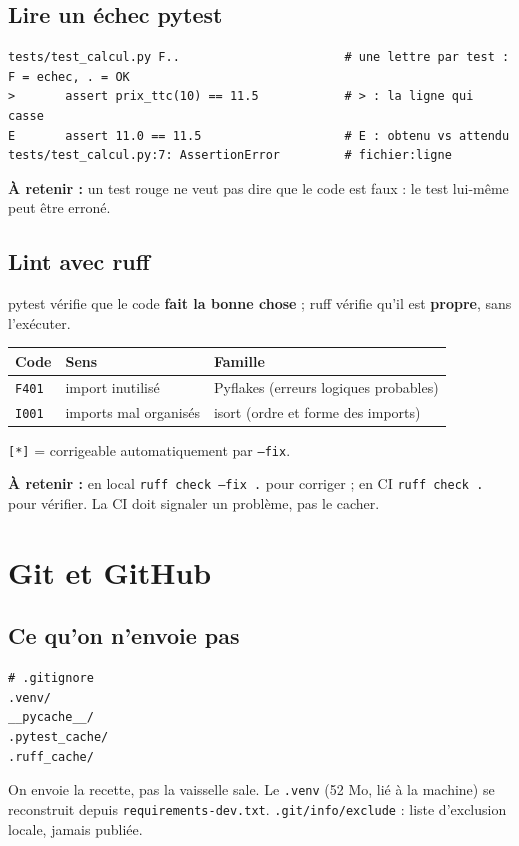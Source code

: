 \documentclass[11pt,a4paper]{article}
\newcommand{\retenir}[1]{\par\smallskip\noindent\colorbox{fondcode}{\parbox{\dimexpr\linewidth-2\fboxsep}{\textbf{\textcolor{bleu}{À retenir :}} #1}}\par\smallskip}
\newcommand{\cmd}[1]{\texttt{#1}}
\begin{document}
\subsection{Lire un échec pytest}
\begin{lstlisting}
tests/test_calcul.py F..                       # une lettre par test : F = echec, . = OK
>       assert prix_ttc(10) == 11.5            # > : la ligne qui casse
E       assert 11.0 == 11.5                    # E : obtenu vs attendu
tests/test_calcul.py:7: AssertionError         # fichier:ligne
\end{lstlisting}
\retenir{un test rouge ne veut pas dire que le code est faux : le test lui-même peut être erroné.}

\subsection{Lint avec ruff}
pytest vérifie que le code \textbf{fait la bonne chose} ; ruff vérifie qu'il est \textbf{propre}, sans l'exécuter.

\begin{center}
\begin{tabular}{@{}lll@{}}
\toprule
\textbf{Code} & \textbf{Sens} & \textbf{Famille} \\
\midrule
\cmd{F401} & import inutilisé & Pyflakes (erreurs logiques probables) \\
\cmd{I001} & imports mal organisés & isort (ordre et forme des imports) \\
\bottomrule
\end{tabular}
\end{center}
\cmd{[*]} = corrigeable automatiquement par \cmd{--fix}.

\retenir{en local \cmd{ruff check --fix .} pour corriger ; en CI \cmd{ruff check .} pour vérifier. La CI doit signaler un problème, pas le cacher.}

\section{Git et GitHub}

\subsection{Ce qu'on n'envoie pas}
\begin{lstlisting}
# .gitignore
.venv/
__pycache__/
.pytest_cache/
.ruff_cache/
\end{lstlisting}
On envoie la recette, pas la vaisselle sale. Le \cmd{.venv} (52 Mo, lié à la machine) se reconstruit depuis \cmd{requirements-dev.txt}. \cmd{.git/info/exclude} : liste d'exclusion locale, jamais publiée.
\end{document}
